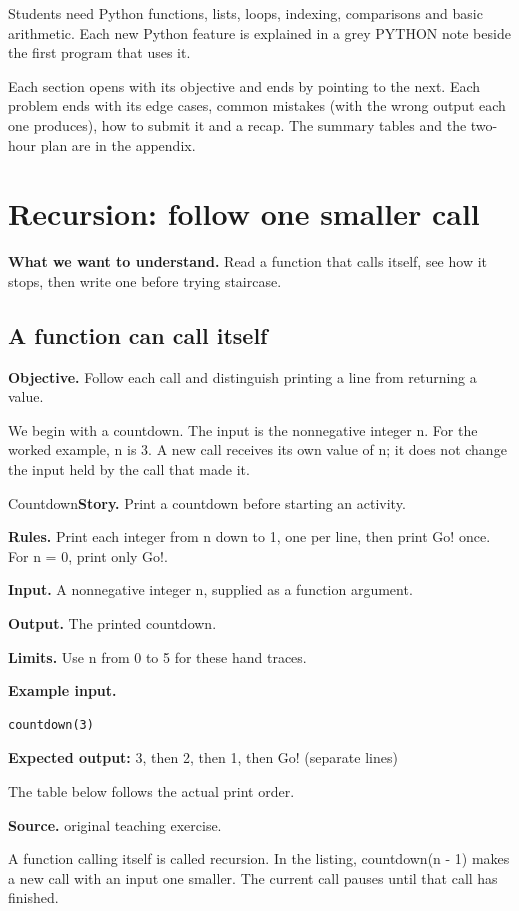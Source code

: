 \documentclass[11pt,a4paper,oneside]{report}
\newcommand{\classref}[1]{\marginpar{\raggedright\fontsize{9}{12}\selectfont\color{quiet}\colorbox{wash}{\heavy\fontsize{8}{10}\selectfont IN THE CLASSROOM}\par\smallskip#1}}
\newcommand{\readinggoal}[1]{\par\textbf{What we want to understand.} #1\par\smallskip}
\newcommand{\sectiongoal}[1]{\par{\color{quiet}\textbf{Objective.} #1}\par\smallskip}
\begin{document}
Students need Python functions, lists, loops, indexing, comparisons and basic arithmetic. Each new Python feature is explained in a grey PYTHON note beside the first program that uses it.

Each section opens with its objective and ends by pointing to the next. Each problem ends with its edge cases, common mistakes (with the wrong output each one produces), how to submit it and a recap. The summary tables and the two-hour plan are in the appendix.


\chapter{Recursion: follow one smaller call}
\readinggoal{Read a function that calls itself, see how it stops, then write one before trying staircase.}
\section{A function can call itself}
\classref{L1-01}
\sectiongoal{Follow each call and distinguish printing a line from returning a value.}
We begin with a countdown. The input is the nonnegative integer n. For the worked example, n is 3. A new call receives its own value of n; it does not change the input held by the call that made it.

\begin{problembox}{Countdown}\textbf{Story.} Print a countdown before starting an activity.\par\smallskip \textbf{Rules.} Print each integer from n down to 1, one per line, then print Go! once. For n = 0, print only Go!.\par\smallskip \textbf{Input.} A nonnegative integer n, supplied as a function argument.\par\smallskip \textbf{Output.} The printed countdown.\par\smallskip \textbf{Limits.} Use n from 0 to 5 for these hand traces.\par\smallskip \textbf{Example input.}
\begin{lstlisting}[language={},aboveskip=2pt,belowskip=2pt]
countdown(3)
\end{lstlisting}
\textbf{Expected output:} 3, then 2, then 1, then Go! (separate lines)\par\smallskip The table below follows the actual print order.\par\smallskip\textbf{Source.} original teaching exercise.\end{problembox}
A function calling itself is called recursion. In the listing, countdown(n - 1) makes a new call with an input one smaller. The current call pauses until that call has finished.
\end{document}
